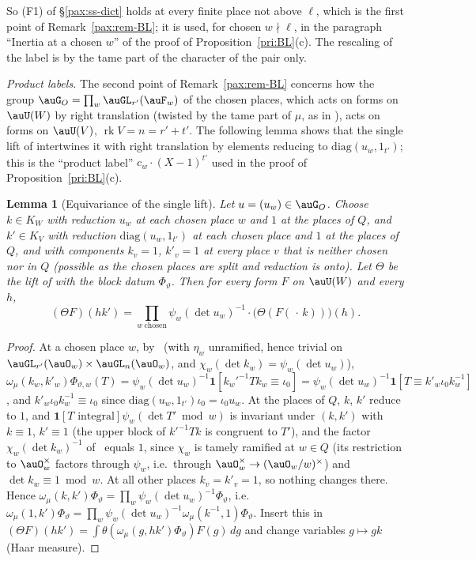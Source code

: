 \documentclass[10pt]{amsart}
\newtheorem{lemma}[theorem]{Lemma}
\theoremstyle{definition}
\theoremstyle{remark}
\providecommand{\plone}{\mathbf 1}
\begin{document}
So (F1) of \S\ref{pax:ss-dict} holds at every finite place not above $\ell$, which is the first point
of Remark~\ref{pax:rem-BL}; it is used, for chosen $w\nmid\ell$, in the paragraph ``Inertia at a chosen $w$'' of the proof of
Proposition~\ref{pri:BL}(c). The rescaling of the label is by the tame part of the character of the
pair only.

\emph{Product labels.} The second point of Remark~\ref{pax:rem-BL} concerns how the group $\auG_O=
\prod_w\auGL_{r'}(\auF_w)$ of the chosen places, which acts on forms on $\auU(W)$ by right
translation (twisted by the tame part of $\mu$, as in {\cite[Proposition~14.27]{P46}}), acts on forms on
$\auU(V)$, $\operatorname{rk}V=n=r'+t'$. The following lemma shows that the single lift of
{\cite[\S2.1]{P54}} intertwines it with right translation by elements reducing to $\mathrm{diag}(u_w,
1_{t'})$; this is the ``product label'' $c_w\cdot(X-1)^{t'}$ used in the proof of
Proposition~\ref{pri:BL}(c).

\begin{lemma}[Equivariance of the single lift]\label{pay:product}
Let $u=(u_w)\in\auG_O$. Choose $k\in K_W$ with reduction $u_w$ at each chosen place $w$ and $1$ at
the places of $Q$, and $k'\in K_V$ with reduction $\mathrm{diag}(u_w,1_{t'})$ at each chosen place
and $1$ at the places of $Q$, and with components $k_v=1$, $k'_v=1$ at every place $v$ that is neither chosen nor in $Q$ (possible as the chosen places are split and reduction is onto). Let
$\Theta$ be the lift of {\cite[\S2.1]{P54}} with the block datum $\Phi_\vartheta$. Then for every form
$F$ on $\auU(W)$ and every $h$,
\[
(\Theta F)(hk')=\prod_{w\ \mathrm{chosen}}\psi_w(\det u_w)^{-1}\cdot\bigl(\Theta(F(\,\cdot\,k))\bigr)(h).
\]
\end{lemma}
\begin{proof}
At a chosen place $w$, by~{\cite[(1)]{P54}} (with $\eta_w$ unramified, hence trivial on $\auGL_{r'}(
\auO_w)\times\auGL_n(\auO_w)$, and $\chi_w(\det k_w)=\psi_w(\det u_w)$),
$\omega_\mu(k_w,k'_w)\Phi_{\vartheta,w}(T)=\psi_w(\det u_w)^{-1}\plone[k_w'^{-1}Tk_w\equiv\iota_0]=
\psi_w(\det u_w)^{-1}\plone[T\equiv k'_w\iota_0k_w^{-1}]$, and $k'_w\iota_0k_w^{-1}\equiv\iota_0$ since
$\mathrm{diag}(u_w,1_{t'})\iota_0=\iota_0u_w$. At the places of $Q$, $k$, $k'$ reduce to $1$, and
$\plone[T\text{ integral}]\psi_w(\det T'\bmod w)$ is invariant under $(k,k')$ with $k\equiv1$, $k'\equiv1$
(the upper block of $k'^{-1}Tk$ is congruent to $T'$), and the factor $\chi_w(\det k_w)^{-1}$ of~{\cite[(1)]{P54}} equals $1$, since $\chi_w$ is tamely ramified at $w\in Q$ (its restriction to $\auO_w^\times$ factors through $\psi_w$, i.e.\ through $\auO_w^\times\to(\auO_w/w)^\times$) and $\det k_w\equiv1\bmod w$. At all other places $k_v=k'_v=1$, so nothing changes there. Hence $\omega_\mu(k,
k')\Phi_\vartheta=\prod_w\psi_w(\det u_w)^{-1}\Phi_\vartheta$, i.e.\ $\omega_\mu(1,k')\Phi_\vartheta=
\prod_w\psi_w(\det u_w)^{-1}\omega_\mu(k^{-1},1)\Phi_\vartheta$. Insert this in $(\Theta F)(hk')=\int
\theta(\omega_\mu(g,hk')\Phi_\vartheta)F(g)\,dg$ and change variables $g\mapsto gk$ (Haar measure).
\end{proof}
\end{document}
